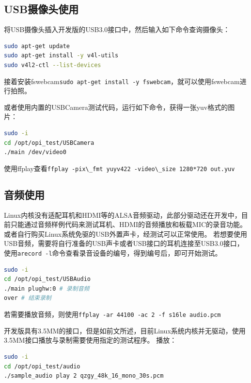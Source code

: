 \subsection{USB摄像头使用}\label{usbux6444ux50cfux5934ux4f7fux7528}

将USB摄像头插入开发版的USB3.0接口中，然后输入如下命令查询摄像头：

\begin{lstlisting}[language=bash]
sudo apt-get update
sudo apt-get install -y v4l-utils
sudo v4l2-ctl --list-devices
\end{lstlisting}

接着安装fswebcam\passthrough{\lstinline!sudo apt-get install -y fswebcam!}，就可以使用fswebcam进行拍照。

或者使用内置的USBCamera测试代码，运行如下命令，获得一张yuv格式的图片：

\begin{lstlisting}[language=bash]
sudo -i
cd /opt/opi_test/USBCamera
./main /dev/video0
\end{lstlisting}

使用ffplay查看\passthrough{\lstinline!ffplay -pix\_fmt yuyv422 -video\_size 1280*720 out.yuv!}

\subsection{音频使用}\label{ux97f3ux9891ux4f7fux7528}

Linux内核没有适配耳机和HDMI等的ALSA音频驱动，此部分驱动还在开发中，目前只能通过音频样例代码来测试耳机、HDMI的音频播放和板载MIC的录音功能。或者自行购买Linux系统免驱的USB外置声卡，经测试可以正常使用。
若想要使用USB音频，需要将自行准备的USB声卡或者USB接口的耳机连接至USB3.0接口，使用\passthrough{\lstinline!arecord -l!}命令查看录音设备的编号，得到编号后，即可开始测试。

\begin{lstlisting}[language=bash]
sudo -i
cd /opt/opi_test/USBAudio
./main plughw:0 # 录制音频
over # 结束录制
\end{lstlisting}

若需要播放音频，则使用\passthrough{\lstinline!ffplay -ar 44100 -ac 2 -f s16le audio.pcm!}

开发版具有3.5MM的接口，但是如前文所述，目前Linux系统内核并无驱动，使用3.5MM接口播放与录制需要使用指定的测试程序。
播放：

\begin{lstlisting}[language=bash]
sudo -i
cd /opt/opi_test/audio
./sample_audio play 2 qzgy_48k_16_mono_30s.pcm
\end{lstlisting}

